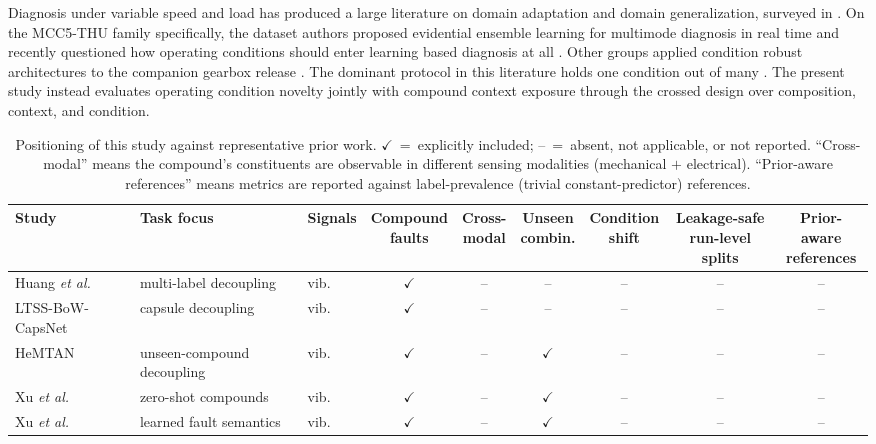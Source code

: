 \documentclass{ieeeaccess}
\begin{document}
Diagnosis under variable speed and load has produced a large literature on
domain adaptation and domain generalization, surveyed in \cite{han2025}. On
the MCC5-THU family specifically, the dataset authors proposed evidential
ensemble learning for multimode diagnosis in real time \cite{liu2024tii} and
recently questioned how operating conditions should enter learning based
diagnosis at all \cite{rethinking2025}. Other groups applied condition robust
architectures to the companion gearbox release \cite{wang2024,phmap2025}. The
dominant protocol in this literature holds one condition out of many
\cite{han2025,domainshift2025}. The present study instead evaluates operating
condition novelty jointly with compound context exposure through the crossed
design over composition, context, and condition.

\begin{table}[!t]
\caption{Positioning of this study against representative prior work. $\checkmark$~=~explicitly included; --~=~absent, not applicable, or not reported. ``Cross-modal'' means the compound's constituents are observable in different sensing modalities (mechanical $+$ electrical). ``Prior-aware references'' means metrics are reported against label-prevalence (trivial constant-predictor) references.}
\label{tab:positioning}
\centering
\footnotesize
\setlength{\tabcolsep}{4.5pt}
\begin{tabular}{l l l c c c c c c}
\hline
Study & Task focus & Signals & \makecell{Compound\\faults} &
\makecell{Cross-\\modal} & \makecell{Unseen\\combin.} &
\makecell{Condition\\shift} & \makecell{Leakage-safe\\run-level splits} &
\makecell{Prior-aware\\references} \\
\hline
Huang \emph{et al.} \cite{huang2019ddcnn} & multi-label decoupling & vib. & $\checkmark$ & -- & -- & -- & -- & -- \\
LTSS-BoW-CapsNet \cite{ltssbow2024} & capsule decoupling & vib. & $\checkmark$ & -- & -- & -- & -- & -- \\
HeMTAN \cite{hemtan2024} & unseen-compound decoupling & vib. & $\checkmark$ & -- & $\checkmark$ & -- & -- & -- \\
Xu \emph{et al.} \cite{eswa2022} & zero-shot compounds & vib. & $\checkmark$ & -- & $\checkmark$ & -- & -- & -- \\
Xu \emph{et al.} \cite{eswa2023} & learned fault semantics & vib. & $\checkmark$ & -- & $\checkmark$ & -- & -- & -- \\

\end{tabular}
\end{table}
\end{document}
